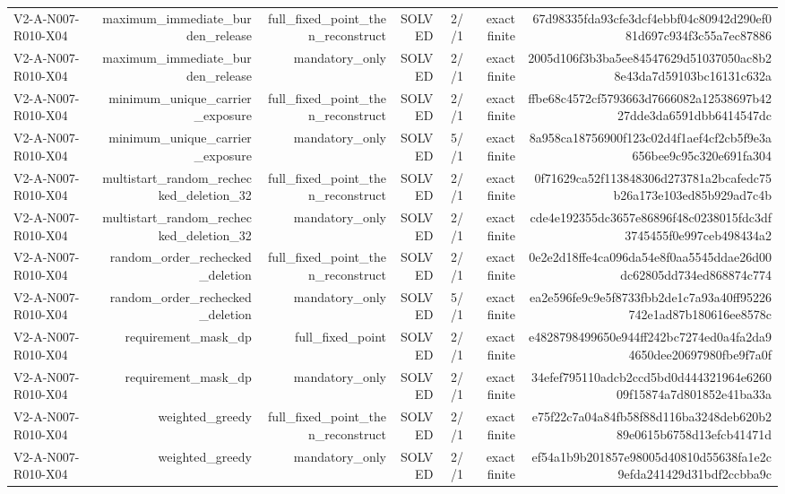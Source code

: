 {\begin{longtable}{lrrrrrr}
V2-A-N007-R010-X04 & maximum\_immediate\_burden\_release & full\_fixed\_point\_then\_reconstruct & SOLVED & 2//1 & exact finite & 67d98335fda93cfe3dcf4ebbf04c80942d290ef081d697c934f3c55a7ec87886 \\
V2-A-N007-R010-X04 & maximum\_immediate\_burden\_release & mandatory\_only & SOLVED & 2//1 & exact finite & 2005d106f3b3ba5ee84547629d51037050ac8b28e43da7d59103bc16131c632a \\
V2-A-N007-R010-X04 & minimum\_unique\_carrier\_exposure & full\_fixed\_point\_then\_reconstruct & SOLVED & 2//1 & exact finite & ffbe68c4572cf5793663d7666082a12538697b4227dde3da6591dbb6414547dc \\
V2-A-N007-R010-X04 & minimum\_unique\_carrier\_exposure & mandatory\_only & SOLVED & 5//1 & exact finite & 8a958ca18756900f123c02d4f1aef4cf2cb5f9e3a656bee9c95c320e691fa304 \\
V2-A-N007-R010-X04 & multistart\_random\_rechecked\_deletion\_32 & full\_fixed\_point\_then\_reconstruct & SOLVED & 2//1 & exact finite & 0f71629ca52f113848306d273781a2bcafedc75b26a173e103ed85b929ad7c4b \\
V2-A-N007-R010-X04 & multistart\_random\_rechecked\_deletion\_32 & mandatory\_only & SOLVED & 2//1 & exact finite & cde4e192355dc3657e86896f48c0238015fdc3df3745455f0e997ceb498434a2 \\
V2-A-N007-R010-X04 & random\_order\_rechecked\_deletion & full\_fixed\_point\_then\_reconstruct & SOLVED & 2//1 & exact finite & 0e2e2d18ffe4ca096da54e8f0aa5545ddae26d00dc62805dd734ed868874c774 \\
V2-A-N007-R010-X04 & random\_order\_rechecked\_deletion & mandatory\_only & SOLVED & 5//1 & exact finite & ea2e596fe9c9e5f8733fbb2de1c7a93a40ff95226742e1ad87b180616ee8578c \\
V2-A-N007-R010-X04 & requirement\_mask\_dp & full\_fixed\_point & SOLVED & 2//1 & exact finite & e4828798499650e944ff242bc7274ed0a4fa2da94650dee20697980fbe9f7a0f \\
V2-A-N007-R010-X04 & requirement\_mask\_dp & mandatory\_only & SOLVED & 2//1 & exact finite & 34efef795110adcb2ccd5bd0d444321964e626009f15874a7d801852e41ba33a \\
V2-A-N007-R010-X04 & weighted\_greedy & full\_fixed\_point\_then\_reconstruct & SOLVED & 2//1 & exact finite & e75f22c7a04a84fb58f88d116ba3248deb620b289e0615b6758d13efcb41471d \\
V2-A-N007-R010-X04 & weighted\_greedy & mandatory\_only & SOLVED & 2//1 & exact finite & ef54a1b9b201857e98005d40810d55638fa1e2c9efda241429d31bdf2ccbba9c \\

\end{longtable}}
